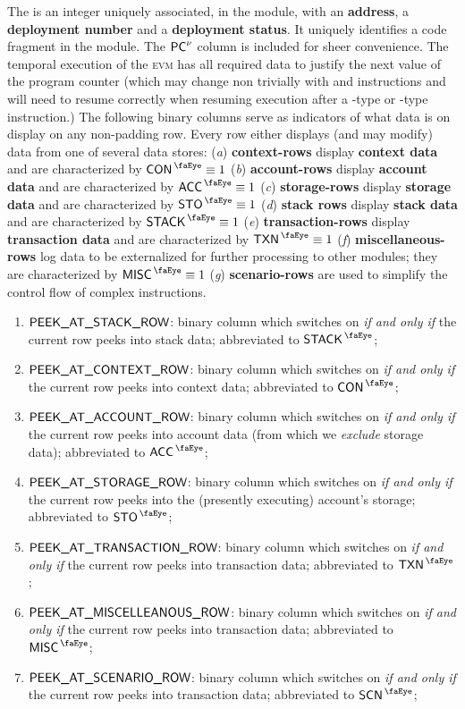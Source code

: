 The \CFI{} is an integer uniquely associated, in the \romLexMod{} module, with an \textbf{address}, a \textbf{deployment number} and a \textbf{deployment status}. It uniquely identifies a code fragment in the \romMod{} module. The $\textsf{PC}^{\nu}$ column is included for sheer convenience. The temporal execution of the \textsc{evm} has all required data to justify the next value of the program counter (which may change non trivially with  and  instructions and will need to resume correctly when resuming execution after a -type or -type instruction.)
The following binary columns serve as indicators of what data is on display on any non-padding row. Every row either displays (and may modify) data from one of several data stores:
(\emph{a}) \textbf{context-rows} display \textbf{context data} and are characterized by $\peekContext \equiv 1$
(\emph{b}) \textbf{account-rows} display \textbf{account data} and are characterized by $\peekAccount \equiv 1$
(\emph{c}) \textbf{storage-rows} display \textbf{storage data} and are characterized by $\peekStorage \equiv 1$
(\emph{d}) \textbf{stack rows} display \textbf{stack data} and are characterized by $\peekStack \equiv 1$
(\emph{e}) \textbf{transaction-rows} display \textbf{transaction data} and are characterized by $\peekTransaction \equiv 1$
(\emph{f}) \textbf{miscellaneous-rows} log data to be externalized for further processing to other modules; they are characterized by $\peekMisc \equiv 1$
(\emph{g}) \textbf{scenario-rows} are used to simplify the control flow of complex instructions.
\begin{enumerate}[resume]
	\item $\textsf{PEEK\_AT\_STACK\_ROW}$:
		binary column which switches on \emph{if and only if} the current row peeks into stack data; 
		abbreviated to $\peekStack$;
	\item $\textsf{PEEK\_AT\_CONTEXT\_ROW}$:
		binary column which switches on \emph{if and only if} the current row peeks into context data; 
		abbreviated to $\peekContext$;
	\item $\textsf{PEEK\_AT\_ACCOUNT\_ROW}$:
		binary column which switches on \emph{if and only if} the current row peeks into account data (from which we \emph{exclude} storage data); 
		abbreviated to $\peekAccount$;
	\item $\textsf{PEEK\_AT\_STORAGE\_ROW}$:
		binary column which switches on \emph{if and only if} the current row peeks into the (presently executing) account's storage; 
		abbreviated to $\peekStorage$;
	\item $\textsf{PEEK\_AT\_TRANSACTION\_ROW}$:
		binary column which switches on \emph{if and only if} the current row peeks into transaction data; 
		abbreviated to $\peekTransaction$;
	\item $\textsf{PEEK\_AT\_MISCELLEANOUS\_ROW}$:
		binary column which switches on \emph{if and only if} the current row peeks into transaction data; 
		abbreviated to $\peekMisc$;
	\item $\textsf{PEEK\_AT\_SCENARIO\_ROW}$:
		binary column which switches on \emph{if and only if} the current row peeks into transaction data; 
		abbreviated to $\peekScenario$;
\end{enumerate}
